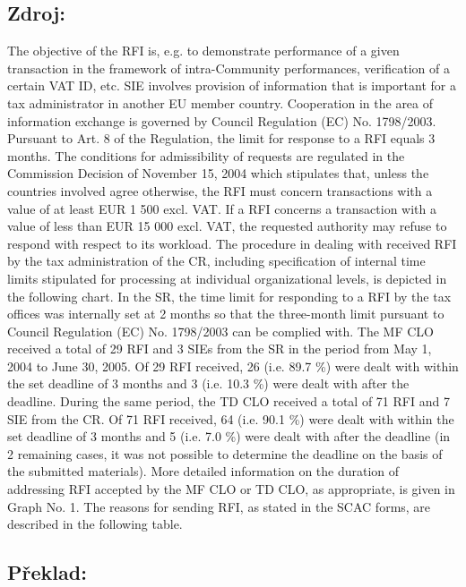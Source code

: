\documentclass[10pt]{article}
\begin{document}
\subsection*{Zdroj:}

The objective of the RFI is, e.g. to demonstrate performance of a given transaction in the framework of intra-Community performances, verification of a certain VAT ID, etc.
SIE involves provision of information that is important for a tax administrator in another EU member country.
Cooperation in the area of information exchange is governed by Council Regulation (EC) No. 1798/2003.
Pursuant to Art. 8 of the Regulation, the limit for response to a RFI equals 3 months.
The conditions for admissibility of requests are regulated in the Commission Decision of November 15, 2004 which stipulates that, unless the countries involved agree otherwise, the RFI must concern transactions with a value of at least EUR 1 500 excl. VAT.
If a RFI concerns a transaction with a value of less than EUR 15 000 excl. VAT, the requested authority may refuse to respond with respect to its workload.
The procedure in dealing with received RFI by the tax administration of the CR, including specification of internal time limits stipulated for processing at individual organizational levels, is depicted in the following chart.
In the SR, the time limit for responding to a RFI by the tax offices was internally set at 2 months so that the three-month limit pursuant to Council Regulation (EC) No. 1798/2003 can be complied with.
The MF CLO received a total of 29 RFI and 3 SIEs from the SR in the period from May 1, 2004 to June 30, 2005.
Of 29 RFI received, 26 (i.e. 89.7 \%) were dealt with within the set deadline of 3 months and 3 (i.e. 10.3 \%) were dealt with after the deadline.
During the same period, the TD CLO received a total of 71 RFI and 7 SIE from the CR.
Of 71 RFI received, 64 (i.e. 90.1 \%) were dealt with within the set deadline of 3 months and 5 (i.e. 7.0 \%) were dealt with after the deadline (in 2 remaining cases, it was not possible to determine the deadline on the basis of the submitted materials).
More detailed information on the duration of addressing RFI accepted by the MF CLO or TD CLO, as appropriate, is given in Graph No. 1.
The reasons for sending RFI, as stated in the SCAC forms, are described in the following table.


\pagebreak

\subsection*{Překlad:}
\end{document}
